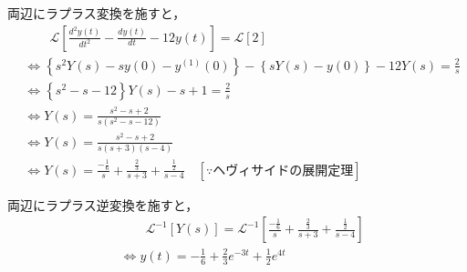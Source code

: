 \documentclass[a4paper,12pt]{article}
\begin{document}
\begin{tcolorbox}[title={[19] つぎの微分方程式をラプラス変換を用いて解け．\\
  \[
  \frac{d^2y(t)}{dt^2} - \frac{dy(t)}{dt} - 12 y(t) = 2
  \]
  
  \quad ただし，初期条件は，\(y(0)=1, y^{(1)}(0)=0\) とする．}]

  \quad 両辺にラプラス変換を施すと，
    \vspace{-3mm}
    \begin{align*}
        &\qquad \mathcal{L}\left[ \frac{d^2y(t)}{dt^2} - \frac{dy(t)}{dt} - 12 y(t) \right] 
        = \mathcal{L} \left[ 2 \right] \\
        &\Leftrightarrow \left\{ s^2 Y(s) - sy(0) - y^{(1)}(0) \right\}
        - \left\{ sY(s) - y(0) \right\}
        - 12 Y(s) = \frac{2}{s}  \\
        &\Leftrightarrow \left\{ s^2 - s - 12 \right\} Y(s) - s + 1= \frac{2}{s}  \\
        &\Leftrightarrow Y(s) = \frac{s^2 - s + 2}{s(s^2 - s - 12)}  \\
        &\Leftrightarrow Y(s) =  \frac{s^2 - s + 2}{ s (s + 3)(s - 4) }  \\
        &\Leftrightarrow Y(s) =  \frac{- \frac{1}{6}}{ s } + \frac{  \frac{2}{3} }{ s + 3 } + \frac{  \frac{1}{2} }{ s - 4 } 
        \quad \left[\because ヘヴィサイドの展開定理 \right]
    \end{align*}
        
    \quad 両辺にラプラス逆変換を施すと，
    \vspace{-3mm}
    \begin{align*}
    &\qquad \mathcal{L}^{-1} \left[ Y(s) \right] 
    = \mathcal{L}^{-1} \left[ \frac{- \frac{1}{6}}{ s } + \frac{  \frac{2}{3} }{ s + 3 } + \frac{  \frac{1}{2} }{ s - 4 }  \right] \\
    &\Leftrightarrow y(t) = - \frac{1}{6} + \frac{2}{3}e^{-3t} + \frac{1}{2}e^{4t}
    \end{align*}
  \end{tcolorbox}
\end{document}

